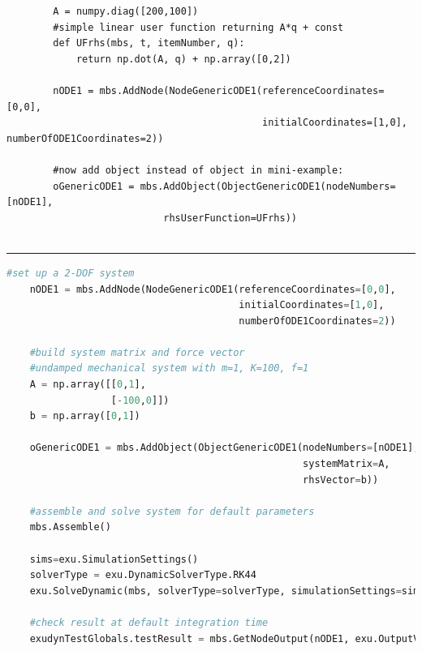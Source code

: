     \userFunctionExample{}
    \pythonstyle\begin{lstlisting}
        A = numpy.diag([200,100])
        #simple linear user function returning A*q + const
        def UFrhs(mbs, t, itemNumber, q): 
            return np.dot(A, q) + np.array([0,2])
            
        nODE1 = mbs.AddNode(NodeGenericODE1(referenceCoordinates=[0,0],
                                            initialCoordinates=[1,0], numberOfODE1Coordinates=2))

        #now add object instead of object in mini-example:
        oGenericODE1 = mbs.AddObject(ObjectGenericODE1(nodeNumbers=[nODE1], 
                           rhsUserFunction=UFrhs))
                                     
    \end{lstlisting}
\vspace{6pt}\par\noindent\rule{\textwidth}{0.4pt}
\label{miniExample_ObjectGenericODE1}
\pythonstyle
\begin{lstlisting}[language=Python, firstnumber=1]
    #set up a 2-DOF system
    nODE1 = mbs.AddNode(NodeGenericODE1(referenceCoordinates=[0,0],
                                        initialCoordinates=[1,0],
                                        numberOfODE1Coordinates=2))

    #build system matrix and force vector
    #undamped mechanical system with m=1, K=100, f=1
    A = np.array([[0,1],
                  [-100,0]])
    b = np.array([0,1])
    
    oGenericODE1 = mbs.AddObject(ObjectGenericODE1(nodeNumbers=[nODE1], 
                                                   systemMatrix=A, 
                                                   rhsVector=b))
    
    #assemble and solve system for default parameters
    mbs.Assemble()
    
    sims=exu.SimulationSettings()
    solverType = exu.DynamicSolverType.RK44
    exu.SolveDynamic(mbs, solverType=solverType, simulationSettings=sims)

    #check result at default integration time
    exudynTestGlobals.testResult = mbs.GetNodeOutput(nODE1, exu.OutputVariableType.Coordinates)[0]
\end{lstlisting}


